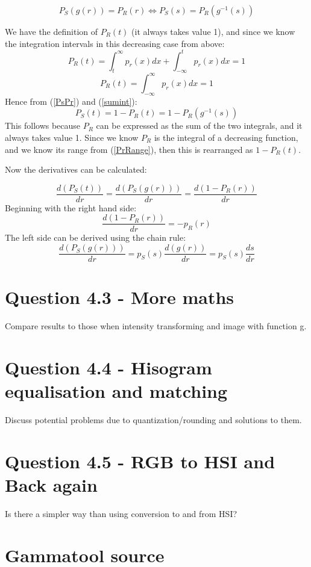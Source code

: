 \documentclass[a4paper]{article}
\begin{document}
\begin{equation}
    P_S(g(r)) = P_R(r) \Leftrightarrow P_S(s) = P_R(g^{-1}(s))
    \label{PsPr}
\end{equation}

We have the definition of $P_R(t)$ (it always takes value 1), and since we know the integration intervals in this decreasing case from above:
\begin{equation}
    P_R(t) = \int_t^\infty p_r(x) dx + \int_{-\infty}^t p_r(x) dx = 1
    \label{sumint}
\end{equation}
\begin{equation}
    P_R(t) = \int_{-\infty}^\infty p_r(x) dx = 1
\end{equation}
Hence from (\ref{PsPr}) and (\ref{sumint}):
\begin{equation}
    P_S(t) = 1 - P_R(t) = 1 - P_R(g^{-1}(s))
\end{equation}
This follows because $P_R$ can be expressed as the sum of the two integrals, and it always takes value 1. Since we know $P_R$ is the integral of a decreasing function, and we know its range from (\ref{PrRange}), then this is rearranged as $1 - P_R(t)$.

Now the derivatives can be calculated:

\begin{equation}
\frac{d(P_S(t))}{dr} = \frac{d(P_S(g(r)))}{dr} = \frac{d(1-P_R(r))}{dr} 
\end{equation}
Beginning with the right hand side:
\begin{equation}
     \frac{d(1-P_R(r))}{dr} = -p_R(r)
\end{equation}
The left side can be derived using the chain rule:
\begin{equation}
    \frac{d(P_S(g(r)))}{dr} = p_S(s) \frac{d(g(r))}{dr} = p_S(s)\frac{ds}{dr}
\end{equation}
\section*{Question 4.3 - More maths} Compare results to those when intensity transforming and image with function g.

\section*{Question 4.4 - Hisogram equalisation and matching} Discuss potential problems due to quantization/rounding and solutions to them.

\section*{Question 4.5 - RGB to HSI and Back again} Is there a simpler way than using conversion to and from HSI?

\appendix 
\section{Gammatool source} \label{appendix-gammatool}  
\end{document}
